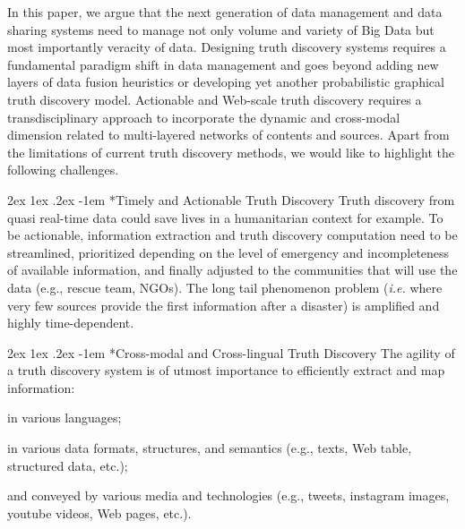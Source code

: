 \documentclass[prodmode,acmtecs]{acmsmall} %
\makeatletter
\renewcommand\paragraph{\@startsection{paragraph}{5}{\z@}%
                                       {2ex \@plus1ex \@minus .2ex}%
                                       {-1em}%
                                      {\sffamily\normalsize\bfseries}}
\makeatother
\begin{document}
 In this paper, we argue that the next generation of data management and data sharing systems need to 
 manage not only volume and variety of Big Data but most importantly veracity of data. Designing truth discovery systems requires a fundamental paradigm shift in data
 management and  goes beyond adding new layers of data fusion heuristics or developing yet another probabilistic graphical truth discovery model. Actionable and Web-scale truth discovery requires a transdisciplinary approach to incorporate the dynamic and cross-modal dimension related to multi-layered networks of contents and sources. 
Apart from the limitations of current truth discovery methods, we would like to highlight the following challenges.

\paragraph*{Timely and Actionable Truth Discovery} 
Truth discovery from quasi real-time data could save lives in a humanitarian context for example. To be actionable, information extraction and truth discovery computation need to be streamlined, prioritized depending on the level of emergency and incompleteness of  available information, and finally adjusted to the communities that will 
use the data (e.g., rescue team, NGOs). The long tail phenomenon problem ({\it i.e.} where very few sources provide the first information after a disaster) is amplified and highly time-dependent.

%
\vspace*{-0.23cm}
\paragraph*{Cross-modal and Cross-lingual Truth Discovery} 
The agility of a truth discovery system is of utmost importance to efficiently extract and map information: 
\begin{inparaenum}[(i)]
\item in various languages;
\item in various data formats, structures, and semantics (e.g., texts, Web table, structured data, etc.); 
\item and conveyed by various media and technologies (e.g., tweets, instagram images, youtube videos, Web pages, etc.).
\end{inparaenum}
%
\vspace*{-0.23cm}
\end{document}
